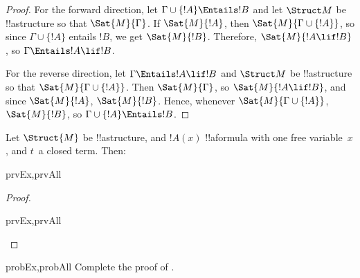 \documentclass[../../../include/open-logic-section]{subfiles}
\begin{document}
\begin{proof}
For the forward direction, let $\Gamma \cup \{ !A \} \Entails !B$ and
let $\Struct M$ be !!a{structure} so that $\Sat{M}{\Gamma}$. If
$\Sat{M}{!A}$, then $\Sat{M}{\Gamma \cup \{ !A \} }$, so since $\Gamma
\cup \{ !A \}$ entails $!B$, we get $\Sat{M}{!B}$. Therefore,
$\Sat{M}{!A \lif !B}$, so $\Gamma \Entails !A \lif !B$.

For the reverse direction, let $\Gamma \Entails !A \lif !B$ and
$\Struct M$ be !!a{structure} so that $\Sat{M}{\Gamma \cup \{ !A
  \}}$. Then $\Sat{M}{\Gamma}$, so $\Sat{M}{!A \lif !B}$, and since
$\Sat{M}{!A}$, $\Sat{M}{!B}$. Hence, whenever $\Sat{M}{\Gamma \cup \{
  !A \} }$, $\Sat{M}{!B}$, so $\Gamma \cup \{ !A \} \Entails !B$.
\end{proof}

\begin{prop}
  Let $\Struct{M}$ be !!a{structure}, and $!A(x)$ !!a{formula} with
  one free variable~$x$, and $t$~a closed term. Then:
  \begin{tagenumerate}{prvEx,prvAll}
  \end{tagenumerate}
\end{prop}

\begin{proof}
  \begin{tagenumerate}{prvEx,prvAll}
  \end{tagenumerate}
\end{proof}

\begin{probtag}{probEx,probAll}
  Complete the proof of .
\end{probtag} 
\end{document}
